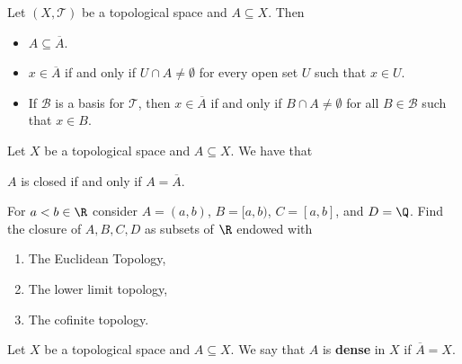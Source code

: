 \begin{remark} Let \( (X,\mathcal{T}) \) be a topological space and \( A \subseteq X  \). Then 
   \begin{itemize}
       \item \( A \subseteq \overline{A} \).
        \item \( x \in \overline{A }  \) if and only if \( U \cap A \neq \emptyset  \) for every open set \( U  \) such that \( x \in U  \). 
        \item If \( \mathcal{B} \) is a basis for \( \mathcal{T} \), then \( x \in \overline{A}\) if and only if \( B \cap A \neq \emptyset  \) for all \( B \in \mathcal{B} \) such that \( x \in B \).
   \end{itemize} 
\end{remark}

\begin{prop}
    Let \( X  \) be a topological space and \( A \subseteq X  \). We have that 
    \begin{center}
        \( A  \) is closed if and only if \( A = \overline{A} \).
    \end{center}
\end{prop}


\begin{problem}
    For \( a < b \in \R  \) consider \( A = (a,b) \), \( B = [a,b) \), \( C = [a,b] \), and \( D = \Q  \). Find the closure of \( A , B , C , D  \) as subsets of \( \R  \) endowed with
    \begin{enumerate}
        \item[(i)] The Euclidean Topology,
        \item[(ii)] The lower limit topology,
        \item[(iii)] The cofinite topology.
    \end{enumerate}
\end{problem}

\begin{definition}[Dense]
    Let \( X  \) be a topological space and \( A \subseteq X   \). We say that \( A  \) is \textbf{dense} in \( X  \) if \( \overline{A} = X  \).
\end{definition}

